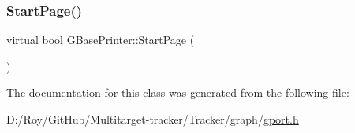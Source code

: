 \mbox{\label{class_g_base_printer_a5c49511be188949312141af0b797ceba}} 
\subsubsection{\texorpdfstring{Start\+Page()}{StartPage()}}
{\footnotesize\ttfamily virtual bool G\+Base\+Printer\+::\+Start\+Page (\begin{DoxyParamCaption}{ }\end{DoxyParamCaption})\hspace{0.3cm}{\ttfamily [pure virtual]}}



The documentation for this class was generated from the following file\+:\begin{DoxyCompactItemize}
\item 
D\+:/\+Roy/\+Git\+Hub/\+Multitarget-\/tracker/\+Tracker/graph/\mbox{\hyperlink{gport_8h}{gport.\+h}}\end{DoxyCompactItemize}
